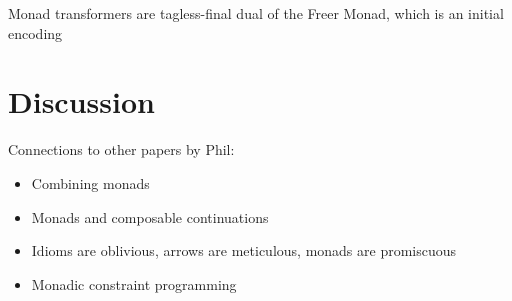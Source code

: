 \documentclass{llncs}
\begin{document}
Monad transformers are tagless-final dual of the Freer Monad, which is
an initial encoding

\section{Discussion}

Connections to other papers by Phil:  
\begin{itemize}
  \item Combining monads
  \item Monads and composable continuations
  \item Idioms are oblivious, arrows are meticulous, monads are promiscuous
  \item Monadic constraint programming
\end{itemize}




\end{document}
